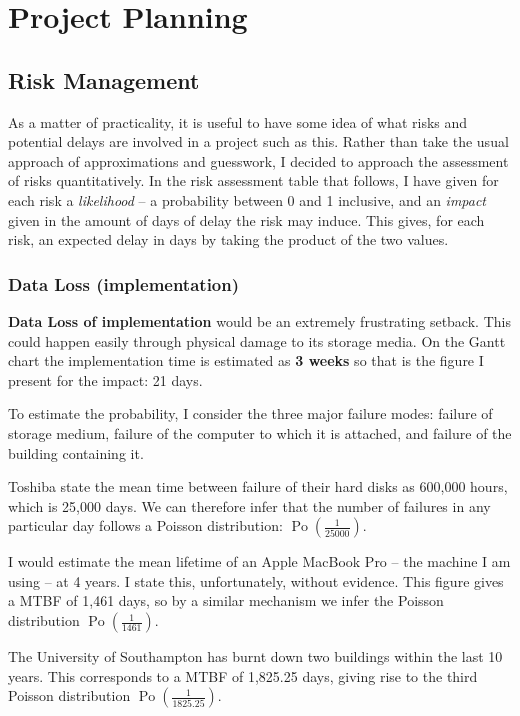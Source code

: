 \chapter{Project Planning}
\section{Risk Management}
As a matter of practicality, it is useful to have some idea of what risks
and potential delays are involved in a project such as this. Rather than
take the usual approach of approximations and guesswork, I decided to
approach the assessment of risks quantitatively. In the risk assessment
table that follows, I have given for each risk a \emph{likelihood} -- a
probability between 0 and 1 inclusive, and an \emph{impact} given in the
amount of days of delay the risk may induce. This gives, for each risk, an
expected delay in days by taking the product of the two values.

\subsection{Data Loss (implementation)}

\textbf{Data Loss of implementation} would be an extremely frustrating
setback. This could happen easily through physical damage to its storage
media. On the Gantt chart the implementation time is estimated as \textbf{3
weeks} so that is the figure I present for the impact: 21 days.

To estimate the probability, I consider the three major failure modes:
failure of storage medium, failure of the computer to which it is attached,
and failure of the building containing it.

Toshiba state the mean time between failure of their hard disks as
600,000 hours, which is 25,000 days\cite{toshibaMTBF}. We can therefore
infer that the number of failures in any particular day follows a
Poisson distribution: $\operatorname{Po}(\frac{1}{25000})$.

I would estimate the mean lifetime of an Apple MacBook Pro -- the machine I
am using -- at 4 years. I state this, unfortunately, without evidence. This
figure gives a MTBF of 1,461 days, so by a similar mechanism we infer the
Poisson distribution $\operatorname{Po}(\frac{1}{1461})$.

The University of Southampton has burnt down two buildings within
the last 10 years\cite{fireRecord, fireRecord2}. This corresponds
to a MTBF of 1,825.25 days, giving rise to the third Poisson
distribution $\operatorname{Po}(\frac{1}{1825.25})$.

